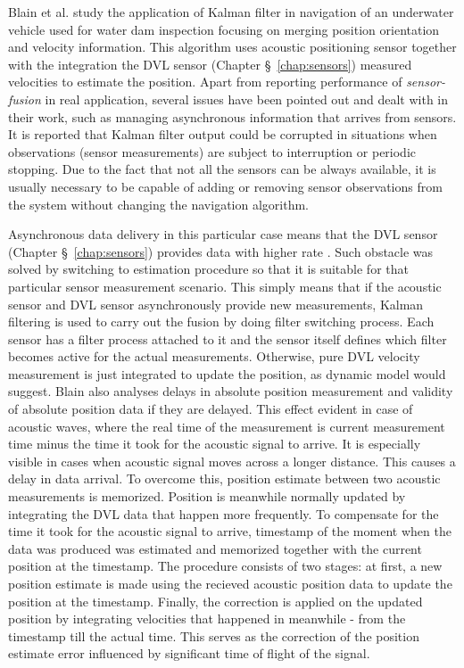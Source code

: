 Blain et al. \cite{blain03} study the application of Kalman filter in navigation of an underwater vehicle used for water dam inspection focusing on merging position orientation and velocity information. This algorithm uses acoustic positioning sensor together with the integration the DVL sensor (Chapter \S~\ref{chap:sensors}) measured velocities \cite{blain03} to estimate the position. Apart from reporting performance of \textit{sensor-fusion} in real application, several issues have been pointed out and dealt with in their work, such as managing asynchronous information that arrives from sensors. It is reported that Kalman filter output could be corrupted in situations when observations (sensor measurements) are subject to interruption or periodic stopping. Due to the fact that not all the sensors can be always available, it is usually necessary to be capable of adding or removing sensor observations from the system without changing the navigation algorithm. 

Asynchronous data delivery in this particular case means that the DVL sensor (Chapter \S~\ref{chap:sensors}) provides data with higher rate \cite{blain03}. Such obstacle was solved by switching to estimation procedure so that it is suitable for that particular sensor measurement scenario. This simply means that if the acoustic sensor and DVL sensor asynchronously provide new measurements, Kalman filtering is used to carry out the fusion by doing filter switching process. Each sensor has a filter process attached to it and the sensor itself defines which filter becomes active for the actual measurements. Otherwise, pure DVL velocity measurement is just integrated to update the position, as dynamic model would suggest.  
Blain also analyses delays in absolute position measurement and validity of absolute position data if they are delayed. This effect evident in case of acoustic waves, where the real time of the measurement is current measurement time minus the time it took for the acoustic signal to arrive. It is especially visible in cases when acoustic signal moves across a longer distance. This causes a delay in data arrival. To overcome this, position estimate between two acoustic measurements is memorized. Position is meanwhile normally updated by integrating the DVL data that happen more frequently. To compensate for the time it took for the acoustic signal to arrive, timestamp of the moment when the data was produced was estimated and memorized together with the current position at the timestamp. The procedure consists of two stages: at first, a new position estimate is made using the recieved acoustic position data to update the position at the timestamp. Finally, the correction is applied on the updated position by integrating velocities that happened in meanwhile - from the timestamp till the actual time. This serves as the correction of the position estimate error influenced by significant time of flight of the signal. 

